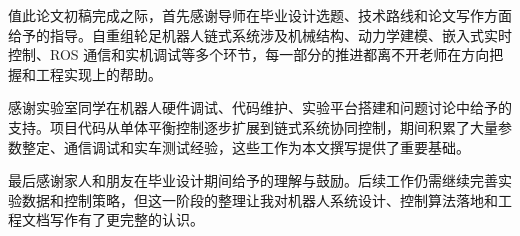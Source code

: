 
\begin{acknowledgements}
  值此论文初稿完成之际，首先感谢导师在毕业设计选题、技术路线和论文写作方面给予的指导。自重组轮足机器人链式系统涉及机械结构、动力学建模、嵌入式实时控制、ROS 通信和实机调试等多个环节，每一部分的推进都离不开老师在方向把握和工程实现上的帮助。

  感谢实验室同学在机器人硬件调试、代码维护、实验平台搭建和问题讨论中给予的支持。项目代码从单体平衡控制逐步扩展到链式系统协同控制，期间积累了大量参数整定、通信调试和实车测试经验，这些工作为本文撰写提供了重要基础。

  最后感谢家人和朋友在毕业设计期间给予的理解与鼓励。后续工作仍需继续完善实验数据和控制策略，但这一阶段的整理让我对机器人系统设计、控制算法落地和工程文档写作有了更完整的认识。

\end{acknowledgements}
